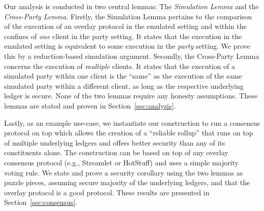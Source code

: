 Our analysis is conducted in two central lemmas: The \emph{Simulation Lemma}
and the \emph{Cross-Party Lemma}.
Firstly, the Simulation Lemma pertains to the comparison of the execution
of an overlay protocol in the emulated setting and within the confines of
\emph{one} \rollerblade client in the party setting.
It states that the execution in the emulated setting
is equivalent to some execution in the \emph{party} setting.
We prove this by a reduction-based simulation argument.
Secondly, the Cross-Party Lemma concerns the execution of \emph{multiple}
\rollerblade clients. It states that the execution of a simulated party
within one \rollerblade client is the ``same'' as the execution of the
same simulated party within a different \rollerblade client, as long
as the respective underlying ledger is secure.
None of the two lemmas require any honesty assumptions.
These lemmas are stated and proven in Section~\ref{sec:analysis}.

Lastly, as an example use-case, we instantiate our \rollerblade construction
to run a consensus protocol on top which allows the creation of a ``reliable
rollup'' that runs on top of multiple underlying ledgers and offers better security
than any of its constituents alone. The construction can be based on top of any
overlay consensus protocol (e.g., Streamlet or HotStuff) and uses a simple
majority voting rule.  We state and prove a security corollary
using the two lemmas as puzzle pieces, assuming secure majority of the underlying
ledgers, and that the overlay protocol is a good protocol. These results
are presented in Section~\ref{sec:consensus}.


